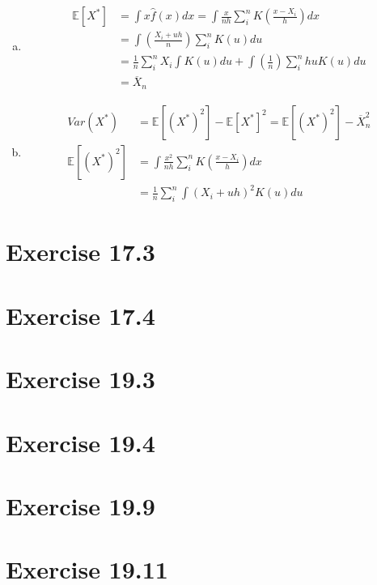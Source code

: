 \documentclass{article}
\newcommand{\olx}[1]{\overline{X}_{#1}}
\newcommand{\E}[1]{\mathbb{E}\left[#1\right]}%
\begin{document}
\begin{enumerate}[(a)]
	\item 
		\begin{align*}
			\E{X^*}	&= \int x\hat{f}(x)dx = \int\frac{x}{nh}\sum_{i}^nK\left(\frac{x-X_i}{h}\right)dx					\\
					&= \int\left(\frac{X_i+uh}{n}\right)\sum_{i}^nK(u)du 												\\
					&= \frac{1}{n}\sum_{i}^nX_i\int K(u)du + \int\left(\frac{1}{n}\right)\sum_{i}^nhuK(u)du		\\
					&= \olx{n}
		\end{align*}
	
	\item 
		\begin{align*}
			Var(X^*)	&= \E{(X^*)^2} - \E{X^*}^2 = \E{(X^*)^2} - \olx{n}^2			\\
			\E{(X^*)^2}	&= \int\frac{x^2}{nh}\sum_{i}^nK\left(\frac{x-X_i}{h}\right)dx	\\
						&= \frac{1}{n}\sum_{i}^n\int(X_i+uh)^2K(u)du
		\end{align*}
	
\end{enumerate}


\section*{Exercise 17.3}



\section*{Exercise 17.4}



\section*{Exercise 19.3}



\section*{Exercise 19.4}



\section*{Exercise 19.9}



\section*{Exercise 19.11}


\end{document}
